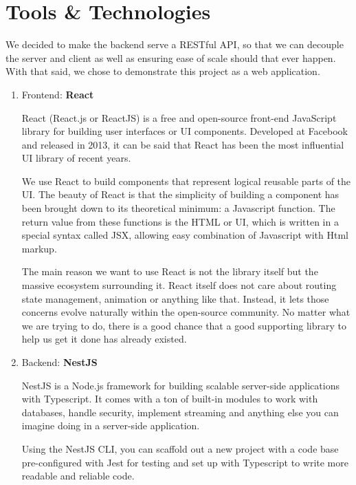 \documentclass[a4paper]{article}
\numberwithin{equation}{section}
\begin{document}
\newpage

\section{Tools \& Technologies}


We decided to make the backend serve a RESTful API, so that we can decouple the server and client as well as ensuring ease of scale should that ever happen.
With that said, we chose to demonstrate this project as a web application.

\begin{enumerate}[label=\alph*.]

  \item Frontend: \textbf{React}

        React (React.js or ReactJS) is a free and open-source front-end JavaScript library for building user interfaces or UI components.
        Developed at Facebook and released in 2013, it can be said that React has been the most influential UI library of recent years.

        We use React to build components that represent logical reusable parts of the UI\@.
        The beauty of React is that the simplicity of building a component has been brought down to its theoretical minimum: a Javascript function.
        The return value from these functions is the HTML or UI, which is written in a special syntax called JSX, allowing easy combination of Javascript with Html markup.

        The main reason we want to use React is not the library itself but the massive ecosystem surrounding it.
        React itself does not care about routing state management, animation or anything like that.
        Instead, it lets those concerns evolve naturally within the open-source community.
        No matter what we are trying to do, there is a good chance that a good supporting library to help us get it done has already existed.

  \item Backend: \textbf{NestJS}

        NestJS is a Node.js framework for building scalable server-side applications with Typescript.
        It comes with a ton of built-in modules to work with databases, handle security, implement streaming and anything else you can imagine doing in a server-side application.

        Using the NestJS CLI, you can scaffold out a new project with a code base pre-configured with Jest for testing and set up with Typescript to write more readable and reliable code.


\end{enumerate}
\end{document}
